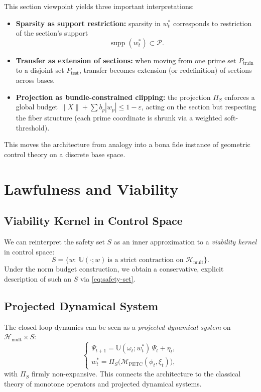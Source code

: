 \documentclass[11pt]{article}
\begin{document}
This section viewpoint yields three important interpretations:
\begin{itemize}
  \item \textbf{Sparsity as support restriction:}
  sparsity in $w_t^\ast$ corresponds to restriction of the section's support
  \[
  \operatorname{supp}(w_t^\ast) \subset \mathcal P.
  \]
  \item \textbf{Transfer as extension of sections:}
  when moving from one prime set $P_{\text{train}}$ to a disjoint set $P_{\text{test}}$, transfer becomes extension (or redefinition) of sections across bases.
  \item \textbf{Projection as bundle-constrained clipping:}
  the projection $\Pi_S$ enforces a global budget $\|X\|+\sum b_p|w_p|\le 1-\varepsilon$, acting on the section but respecting the fiber structure (each prime coordinate is shrunk via a weighted soft-threshold).
\end{itemize}

This moves the architecture from analogy into a bona fide instance of geometric control theory on a discrete base space.

\section{Lawfulness and Viability}

\subsection{Viability Kernel in Control Space}

We can reinterpret the safety set $S$ as an inner approximation to a \emph{viability kernel} in control space:
\[
S = \{w:\ \mathbb U(\cdot;w)\ \text{is a strict contraction on }\mathcal H_{\mathrm{mult}}\}.
\]
Under the norm budget construction, we obtain a conservative, explicit description of such an $S$ via \eqref{eq:safety-set}.

\subsection{Projected Dynamical System}

The closed-loop dynamics can be seen as a \emph{projected dynamical system} on $\mathcal H_{\mathrm{mult}}\times S$:
\begin{equation}
\begin{cases}
  \Psi_{t+1} = \mathbb U(\omega_t; w_t^\ast)\,\Psi_t + \eta_t,\\[3pt]
  w_t^\ast = \Pi_S\bigl(\mathcal M_{\mathrm{PETC}}(\phi_t,\xi_t)\bigr),
\end{cases}
\end{equation}
with $\Pi_S$ firmly non-expansive. This connects the architecture to the classical theory of monotone operators and projected dynamical systems.
\end{document}
